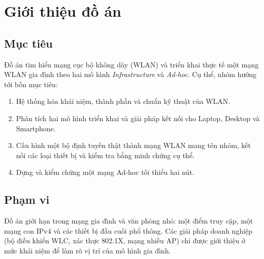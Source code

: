 \documentclass[12pt,a4paper]{article}
\numberwithin{figure}{section}
\numberwithin{table}{section}
\begin{document}
\section{Giới thiệu đồ án}
\label{sec:gioithieu}

\subsection{Mục tiêu}
Đồ án tìm hiểu mạng cục bộ không dây (WLAN) và triển khai thực tế một mạng
WLAN gia đình theo hai mô hình \emph{Infrastructure} và \emph{Ad-hoc}. Cụ thể,
nhóm hướng tới bốn mục tiêu:
\begin{enumerate}
  \item Hệ thống hóa khái niệm, thành phần và chuẩn kỹ thuật của WLAN.
  \item Phân tích hai mô hình triển khai và giải pháp kết nối cho Laptop,
    Desktop và Smartphone.
  \item Cấu hình một bộ định tuyến thật thành mạng WLAN mang tên nhóm, kết nối các
    loại thiết bị và kiểm tra bằng minh chứng cụ thể.
  \item Dựng và kiểm chứng một mạng Ad-hoc tối thiểu hai nút.
\end{enumerate}

\subsection{Phạm vi}
Đồ án giới hạn trong mạng gia đình và văn phòng nhỏ: một điểm truy cập, một
mạng con IPv4 và các thiết bị đầu cuối phổ thông. Các giải pháp doanh nghiệp
(bộ điều khiển WLC, xác thực 802.1X, mạng nhiều AP) chỉ được giới thiệu ở mức
khái niệm để làm rõ vị trí của mô hình gia đình.
\end{document}
